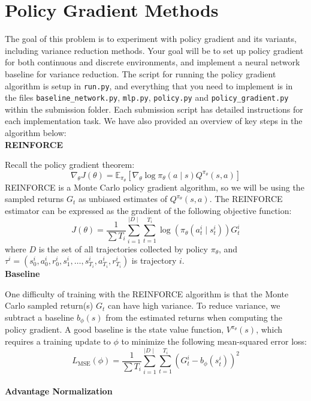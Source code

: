 \section{Policy Gradient Methods}

The goal of this problem is to experiment with policy gradient and its variants, including variance reduction methods. Your goal will be to set up policy gradient for both continuous and discrete environments, and implement a neural network baseline for variance reduction. The script for running the policy gradient algorithm is setup in \texttt{run.py}, and everything that you need to implement is in the files \texttt{baseline\_network.py}, \texttt{mlp.py}, \texttt{policy.py} and \texttt{policy\_gradient.py} within the submission folder. Each submission script has detailed instructions for each implementation task. We have also provided an overview of key steps in the algorithm below: \\


\textbf{REINFORCE}

Recall the policy gradient theorem:
\[ \nabla_\theta J(\theta) = \mathbb E_{\pi_\theta} \left[ \nabla_\theta \log\pi_\theta(a \mid s) Q^{\pi_\theta} (s,a) \right] \]
REINFORCE is a Monte Carlo policy gradient algorithm, so we will be using the sampled returns $G_t$ as unbiased estimates of $Q^{\pi_\theta}(s,a)$. 
The REINFORCE estimator can be expressed as the gradient of the following objective function:
\[ J(\theta) = \frac{1}{\sum T_i} \sum_{i=1}^{\mid D \mid} \sum_{t=1}^{T_i} \log(\pi_\theta(a^i_t \mid s^i_t)) G^i_t \]
where $D$ is the set of all trajectories collected by policy $\pi_\theta$, and $\tau^i =(s^i_0, a^i_0, r^i_0, s^i_1, \dots, s^i_{T_i}, a^i_{T_i}, r^i_{T_i})$ is trajectory $i$. \\

\textbf{Baseline}

One difficulty of training with the REINFORCE algorithm is that the Monte Carlo sampled return(s) $G_t$ can have high variance. To reduce variance, we subtract a baseline $b_{\phi}(s)$ from the estimated returns when computing the policy gradient. A good baseline is the state value function, $V^{\pi_\theta}(s)$, which requires a training update to $\phi$ to minimize the following mean-squared error loss:
\[ L_{\text{MSE}}(\phi) = \frac{1}{\sum T_i} \sum_{i=1}^{\mid D \mid} \sum_{t=1}^{T_i} (G^i_t - b_{\phi}(s^i_t))^2\] \\

\textbf{Advantage Normalization}

